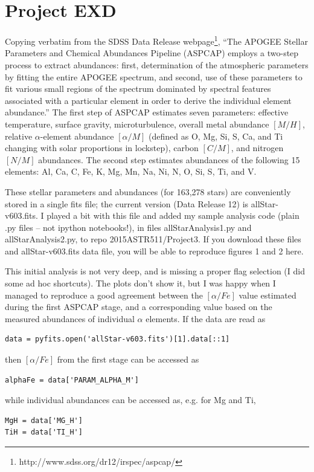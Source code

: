 \documentclass[12pt,preprint]{aastex}
\begin{document}
\section{Project EXD}

Copying verbatim from the SDSS Data Release webpage\footnote{http://www.sdss.org/dr12/irspec/aspcap/},
``The APOGEE Stellar Parameters and Chemical Abundances Pipeline (ASPCAP) employs a two-step process 
to extract abundances: first, determination of the atmospheric parameters by fitting the entire APOGEE spectrum, 
and second, use of these parameters to fit various small regions of the spectrum dominated by spectral features
 associated with a particular element in order to derive the individual element abundance.''
The first step of ASPCAP estimates seven parameters: effective temperature, surface gravity, microturbulence, 
overall metal abundance $[M/H]$, relative $\alpha$-element abundance $[\alpha/M]$ (defined as O, Mg, Si, S, 
Ca, and Ti changing with solar proportions in lockstep), carbon $[C/M]$, and nitrogen $[N/M]$ abundances.
The second step estimates abundances of the following 15 elements: Al, Ca, C, Fe, K, Mg, Mn, Na, Ni, N, O, Si, S, Ti, and V.

These stellar parameters and abundances (for 163,278 stars) are conveniently stored in a single fits file; the 
current version (Data Release 12) is allStar-v603.fits. I played a bit with this file and added my sample analysis 
code (plain .py files -- not ipython notebooks!), in files allStarAnalysis1.py and allStarAnalysis2.py, to repo 
2015ASTR511/Project3. If you download these files and allStar-v603.fits data file, you will be able to reproduce
figures 1 and 2 here. 

This initial analysis is not very deep, and is missing a proper flag selection (I did some ad hoc shortcuts).
The plots don't show it, but I was happy when I managed to reproduce a good agreement between 
the $[\alpha/Fe]$ value estimated during the first ASPCAP stage, and a corresponding value based on the
measured abundances of individual $\alpha$ elements. If the data are read as 
\begin{verbatim}
data = pyfits.open('allStar-v603.fits')[1].data[::1] 
\end{verbatim}
then $[\alpha/Fe]$ from the first stage can be accessed as 
\begin{verbatim}
alphaFe = data['PARAM_ALPHA_M']
\end{verbatim}
while individual abundances can be accessed as, e.g. for Mg and Ti,
\begin{verbatim}
MgH = data['MG_H']
TiH = data['TI_H']
\end{verbatim}
\end{document}
